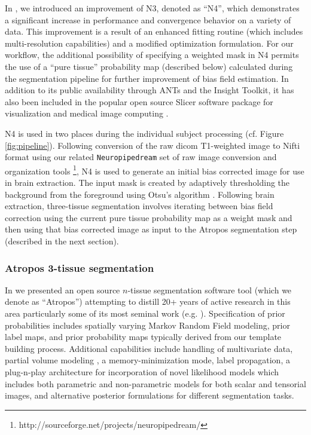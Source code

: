 In \cite{tustison2010}, we introduced an improvement of N3, denoted as
``N4'', which demonstrates a significant increase in performance and convergence behavior
on a variety of data.  This improvement is a result of an enhanced 
fitting routine (which includes multi-resolution capabilities) and a modified optimization 
formulation.  For our workflow, the additional possibility of specifying
a weighted mask in N4 permits the use of a ``pure tissue'' probability map 
(described below)
calculated during the segmentation pipeline for further improvement of 
bias field estimation.  In addition to its public availability 
through ANTs and the Insight Toolkit, it has also been included in
the popular open source Slicer software package for visualization and medical
image computing \cite{fedorov2011}.

N4 is used in two places during the individual subject processing (cf. Figure
\ref{fig:pipeline}).  Following conversion of the raw dicom T1-weighted image
to Nifti format using our related \verb#Neuropipedream# set of raw image conversion
and organization tools%
\footnote{
http://sourceforge.net/projects/neuropipedream/
}, N4 is used to generate an initial bias corrected image for use in
brain extraction.  The input mask is created by adaptively thresholding 
the background from the foreground using Otsu's algorithm \cite{otsu1979}.
Following brain extraction, three-tissue segmentation involves iterating
between bias field correction using the current pure tissue 
probability map as a weight mask and then using that bias corrected image
as input to the Atropos segmentation step (described in the next section). 

\subsubsection{Atropos 3-tissue segmentation}

In \cite{avants2011a} we presented an open source $n$-tissue segmentation software tool
(which we denote as ``Atropos'') attempting to distill 20+ years of active research in this area
particularly some of its most seminal work (e.g. \cite{zhang2001,ashburner2005}). 
Specification of prior probabilities includes spatially varying Markov Random Field modeling, 
prior label maps, and prior probability maps typically derived from our template building 
process.  Additional
capabilities include handling of multivariate data, 
partial volume modeling \cite{shattuck2001}, a memory-minimization mode,
label propagation, a plug-n-play architecture for incorporation of novel likelihood models
which includes both parametric and non-parametric models for both scalar and tensorial
images, and alternative posterior formulations for different segmentation tasks.

